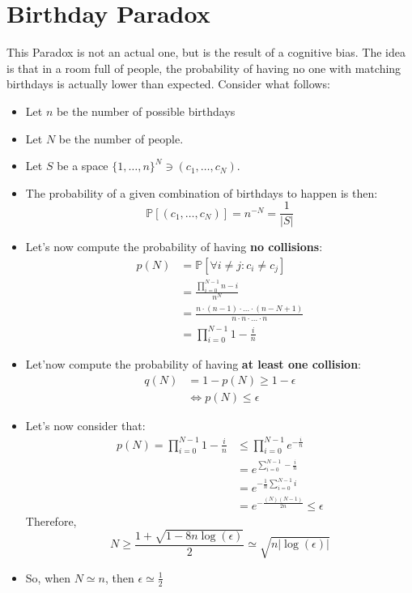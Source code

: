 \section{Birthday Paradox}
This Paradox is not an actual one, but is the result of a cognitive bias. \newline
The idea is that in a room full of people, the probability of having no one with matching birthdays is actually lower than expected.\newline
Consider what follows:
\begin{itemize}
    \item Let $n$ be the number of possible birthdays
    \item Let $N$ be the number of people.
    \item Let $S$ be a space $\{1, \dots, n\}^{N} \ni (c_{1}, \dots, c_{N})$.
    \item The probability of a given combination of birthdays to happen is then:
    \[
    \mathbb{P}[(c_{1}, \dots, c_{N})] = n^{-N} = \frac{1}{|S|}
    \]
    \item Let's now compute the probability of having \textbf{no collisions}:
    \begin{align*}
        p(N) &= \mathbb{P}[\forall i \neq j: c_{i} \neq c_{j}] \\
        &= \frac{\prod_{i=0}^{N-1} n - i}{n^{N}} \\
        &= \frac{n \cdot (n-1) \cdot \dots \cdot (n - N + 1)}{n \cdot n \cdot \dots \cdot n} \\
        &= \prod_{i=0}^{N-1} 1 - \frac{i}{n}
    \end{align*}
    \item Let'now compute the probability of having \textbf{at least one collision}:
    \begin{align*}
        q(N) &= 1 - p(N) \geq 1 - \epsilon \\
        & \iff p(N) \leq \epsilon
    \end{align*}
    \item Let's now consider that:
    \begin{align*}
        p(N) = \prod_{i=0}^{N-1} 1 - \frac{i}{n} &\leq \prod_{i=0}^{N-1} e^{-\frac{i}{n}}\\
        & = e^{\sum_{i=0}^{N-1}-\frac{i}{n}}\\
        & = e^{-\frac{1}{n}\sum_{i=0}^{N-1}i}\\
        & = e^{-\frac{(N)(N-1)}{2n}} \leq \epsilon
    \end{align*}
    Therefore,
    \[
        N \geq \frac{1+\sqrt{1 - 8n \operatorname{log}(\epsilon)}}{2} \simeq \sqrt{n |\operatorname{log}(\epsilon)|}
    \]
    \item So, when $N \simeq n$, then $\epsilon \simeq \frac{1}{2}$
\end{itemize}
